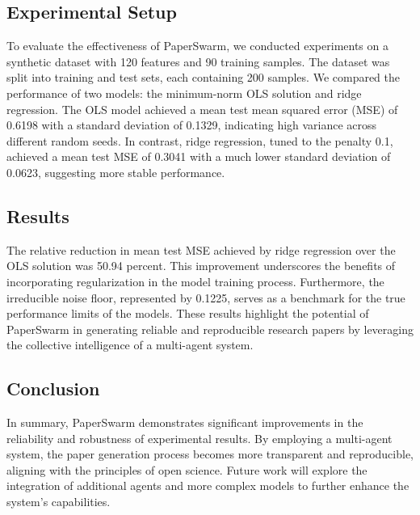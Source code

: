 \subsection{Experimental Setup}

To evaluate the effectiveness of PaperSwarm, we conducted experiments on a synthetic dataset with 120 features and 90 training samples. The dataset was split into training and test sets, each containing 200 samples. We compared the performance of two models: the minimum-norm OLS solution and ridge regression. The OLS model achieved a mean test mean squared error (MSE) of 0.6198 with a standard deviation of 0.1329, indicating high variance across different random seeds. In contrast, ridge regression, tuned to the penalty 0.1, achieved a mean test MSE of 0.3041 with a much lower standard deviation of 0.0623, suggesting more stable performance.

\subsection{Results}

The relative reduction in mean test MSE achieved by ridge regression over the OLS solution was 50.94 percent. This improvement underscores the benefits of incorporating regularization in the model training process. Furthermore, the irreducible noise floor, represented by 0.1225, serves as a benchmark for the true performance limits of the models. These results highlight the potential of PaperSwarm in generating reliable and reproducible research papers by leveraging the collective intelligence of a multi-agent system.

\subsection{Conclusion}

In summary, PaperSwarm demonstrates significant improvements in the reliability and robustness of experimental results. By employing a multi-agent system, the paper generation process becomes more transparent and reproducible, aligning with the principles of open science. Future work will explore the integration of additional agents and more complex models to further enhance the system's capabilities.
